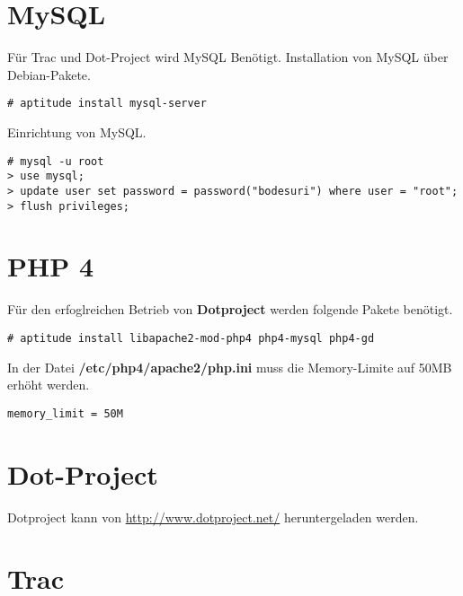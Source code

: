 \documentclass[12pt,halfparskip]{scrreprt}
\begin{document}

\section{MySQL} %
\label{sec:mysql}

Für Trac und Dot-Project wird MySQL Benötigt. Installation von MySQL über Debian-Pakete.

\begin{verbatim}
# aptitude install mysql-server
\end{verbatim}

Einrichtung von MySQL.

\begin{verbatim}
# mysql -u root
> use mysql;
> update user set password = password("bodesuri") where user = "root";
> flush privileges;
\end{verbatim}


\section{PHP 4} %
\label{sec:php_4}

Für den erfoglreichen Betrieb von \textbf{Dotproject} werden folgende Pakete benötigt.

\begin{verbatim}
# aptitude install libapache2-mod-php4 php4-mysql php4-gd
\end{verbatim}


In der Datei \textbf{/etc/php4/apache2/php.ini} muss die Memory-Limite auf 50MB erhöht werden.

\begin{verbatim}
memory_limit = 50M  
\end{verbatim}


\section{Dot-Project} %
\label{sec:dot_project}

Dotproject kann von \url{http://www.dotproject.net/} heruntergeladen werden.



\section{Trac}
\end{document}
